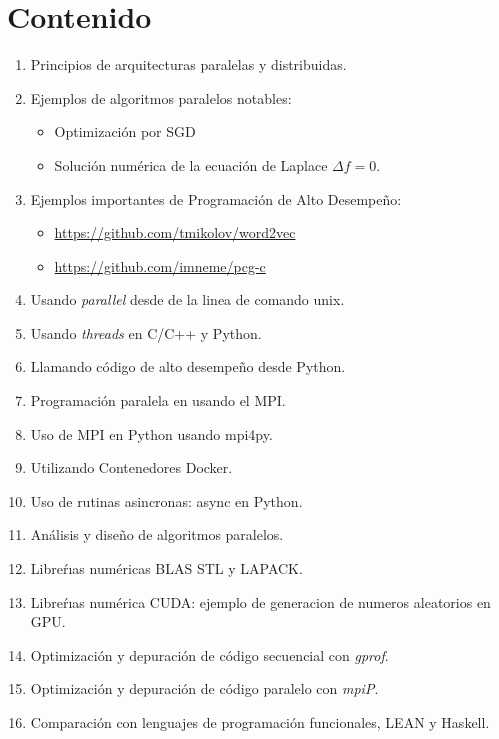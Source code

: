 \documentclass[letterpaper]{article}
\begin{document}
\section*{Contenido} %
\begin{enumerate}
    \item Principios de arquitecturas paralelas y distribuidas. %
    \item Ejemplos de algoritmos paralelos notables:
        \begin{itemize}
            \item Optimización por SGD
            \item Solución numérica de la ecuación de Laplace $\Delta f = 0$.
        \end{itemize}
    \item Ejemplos importantes de Programación de Alto Desempeño:
        \begin{itemize}
            \item \url{https://github.com/tmikolov/word2vec}
            \item \url{https://github.com/imneme/pcg-c}
        \end{itemize}
    \item Usando \emph{parallel} desde de la linea de comando unix.
    \item Usando \emph{threads} en C/C++ y Python.
    \item Llamando código de alto desempeño desde Python.
    \item Programación paralela en usando el MPI. %
    \item Uso de MPI en Python usando mpi4py.
    \item Utilizando Contenedores Docker.
    \item Uso de rutinas asincronas: async en Python.
    \item Análisis y diseño de algoritmos paralelos. %
    \item Libreŕıas numéricas BLAS STL y LAPACK. %
    \item Libreŕıas numérica CUDA: ejemplo de generacion de numeros aleatorios en GPU.
    \item Optimización y depuración de código secuencial con \emph{gprof}.
    \item Optimización y depuración de código paralelo con \emph{mpiP}.
    \item Comparación con lenguajes de programación funcionales, LEAN y Haskell.
\end{enumerate}
\end{document}
